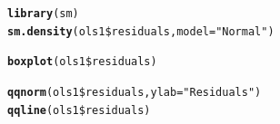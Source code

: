 \documentclass[11pt,openany]{book}\usepackage[]{graphicx}\usepackage[]{color}
\makeatletter
\newcommand{\hlstr}[1]{\textcolor[rgb]{0.192,0.494,0.8}{#1}}%
\newcommand{\hlopt}[1]{\textcolor[rgb]{0,0,0}{#1}}%
\newcommand{\hlstd}[1]{\textcolor[rgb]{0.345,0.345,0.345}{#1}}%
\newcommand{\hlkwc}[1]{\textcolor[rgb]{0.333,0.667,0.333}{#1}}%
\newcommand{\hlkwd}[1]{\textcolor[rgb]{0.737,0.353,0.396}{\textbf{#1}}}%
\newenvironment{kframe}{%
 \def\at@end@of@kframe{}%
 \ifinner\ifhmode%
  \def\at@end@of@kframe{\end{minipage}}%
  \begin{minipage}{\columnwidth}%
 \fi\fi%
 \def\FrameCommand##1{\hskip\@totalleftmargin \hskip-\fboxsep
 \colorbox{shadecolor}{##1}\hskip-\fboxsep
     \hskip-\linewidth \hskip-\@totalleftmargin \hskip\columnwidth}%
 \MakeFramed {\advance\hsize-\width
   \@totalleftmargin\z@ \linewidth\hsize
   \@setminipage}}%
 {\par\unskip\endMakeFramed%
 \at@end@of@kframe}
\newenvironment{knitrout}{}{} %
\renewenvironment{knitrout}{\begin{singlespace}}{\end{singlespace}}
\makeatother
\begin{document}
\begin{knitrout}
\color{fgcolor}\begin{kframe}
\begin{alltt}
\hlkwd{library}\hlstd{(sm)}
\hlkwd{sm.density}\hlstd{(ols1}\hlopt{\$}\hlstd{residuals,} \hlkwc{model} \hlstd{=} \hlstr{"Normal"}\hlstd{)}
\end{alltt}
\end{kframe}
\end{knitrout}
 
\begin{knitrout}
\color{fgcolor}\begin{kframe}
\begin{alltt}
\hlkwd{boxplot}\hlstd{(ols1}\hlopt{\$}\hlstd{residuals)}
\end{alltt}
\end{kframe}
\end{knitrout}

\begin{knitrout}
\color{fgcolor}\begin{kframe}
\begin{alltt}
\hlkwd{qqnorm}\hlstd{(ols1}\hlopt{\$}\hlstd{residuals,} \hlkwc{ylab} \hlstd{=} \hlstr{"Residuals"}\hlstd{)}
\hlkwd{qqline}\hlstd{(ols1}\hlopt{\$}\hlstd{residuals)}
\end{alltt}
\end{kframe}
\end{knitrout}
\end{document}
